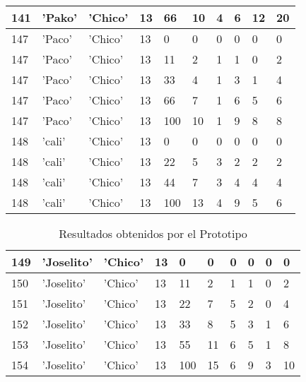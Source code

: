 \begin{table}[H]
\begin{center}
\begin{tabular}{ @{} | m{2em} | m{4em} | m{3em} | m{2em} | m{4em} | m{4em} | m{4em} | m{3em} | m{3em} | m{4em} |  }
  \hline
  141  & 'Pako' & 'Chico' &13 &66 &10 &4 &6 &12 &20  \\
  \hline
  147  & 'Paco' & 'Chico' &13 &0 &0 &0 &0 &0 &0  \\
  \hline
  147  & 'Paco' & 'Chico' &13 &11 &2 &1 &1 &0 &2  \\
  \hline
  147  & 'Paco' & 'Chico' &13 &33 &4 &1 &3 &1 &4  \\
  \hline
  147  & 'Paco' & 'Chico' &13 &66 &7 &1 &6 &5 &6  \\
  \hline
  147  & 'Paco' & 'Chico' &13 &100 &10 &1 &9 &8 &8  \\
  \hline
  148  & 'cali' & 'Chico' &13 &0 &0 &0 &0 &0 &0  \\
  \hline
  148  & 'cali' & 'Chico' &13 &22 &5 &3 &2 &2 &2  \\
  \hline
  148  & 'cali' & 'Chico' &13 &44 &7 &3 &4 &4 &4  \\
  \hline
  148  & 'cali' & 'Chico' &13 &100 &13 &4 &9 &5 &6  \\
  \hline
\end{tabular}
\centering
\end{center}
\end{table}  

\begin{table}[H]
  \begin{center}
  \hspace*{-40px}
  \begin{tabular}{ @{} | m{2em} | m{4em} | m{3em} | m{2em} | m{4em} | m{4em} | m{4em} | m{3em} | m{3em} | m{4em} |  } 
  \hline
  149  & 'Joselito' & 'Chico' &13 &0 &0 &0 &0 &0 &0  \\
  \hline
  150  & 'Joselito' & 'Chico' &13 &11 &2 &1 &1 &0 &2  \\
  \hline
  151  & 'Joselito' & 'Chico' &13 &22 &7 &5 &2 &0 &4  \\
  \hline
  152  & 'Joselito' & 'Chico' &13 &33 &8 &5 &3 &1 &6  \\
  \hline
  153  & 'Joselito' & 'Chico' &13 &55 &11 &6 &5 &1 &8  \\
  \hline
  154  & 'Joselito' & 'Chico' &13 &100 &15 &6 &9 &3 &10  \\
  \hline
\end{tabular}
\centering
\caption{Resultados obtenidos por el Prototipo}
\label{fig:tablabbddpc}
\end{center}
\end{table}  


